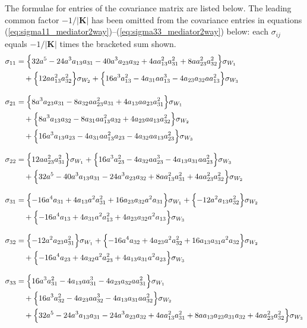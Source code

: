 \documentclass{article}
\begin{document}
The formulae for entries of the covariance matrix are listed below.
The leading common factor $-1/|\mathbf{K}|$ has been omitted from the
covariance entries in equations
(\ref{eq:sigma11_mediator2way})--(\ref{eq:sigma33_mediator2way}) below: each
$\sigma_{ij}$ equals $-1/|\mathbf{K}|$ times the bracketed sum shown.
\begin{align}
\sigma_{11}&= \Bigl\{ 32a^5-24a^3a_{13}a_{31}-40a^3a_{23}a_{32}+4aa_{13}^2a_{31}^2+8aa_{23}^2a_{32}^2 \Bigr\} \sigma_{W_{1}} \nonumber \\
&\quad + \Bigl\{ 12aa_{13}^2a_{32}^2 \Bigr\} \sigma_{W_{2}} + \Bigl\{ 16a^3a_{13}^2-4a_{31}aa_{13}^3-4a_{23}a_{32}aa_{13}^2 \Bigr\} \sigma_{W_{3}} \label{eq:sigma11_mediator2way} \\[8pt]
\sigma_{21}&= \Bigl\{ 8a^3a_{23}a_{31}-8a_{32}aa_{23}^2a_{31}+4a_{13}aa_{23}a_{31}^2 \Bigr\} \sigma_{W_{1}} \nonumber \\
&\quad + \Bigl\{ 8a^3a_{13}a_{32}-8a_{31}aa_{13}^2a_{32}+4a_{23}aa_{13}a_{32}^2 \Bigr\} \sigma_{W_{2}} \nonumber \\
&\quad + \Bigl\{ 16a^3a_{13}a_{23}-4a_{31}aa_{13}^2a_{23}-4a_{32}aa_{13}a_{23}^2 \Bigr\} \sigma_{W_{3}} \label{eq:sigma21_mediator2way} \\[8pt]
\sigma_{22}&= \Bigl\{ 12aa_{23}^2a_{31}^2 \Bigr\} \sigma_{W_{1}} + \Bigl\{ 16a^3a_{23}^2-4a_{32}aa_{23}^3-4a_{13}a_{31}aa_{23}^2 \Bigr\} \sigma_{W_{3}} \nonumber \\
&\quad + \Bigl\{ 32a^5-40a^3a_{13}a_{31}-24a^3a_{23}a_{32}+8aa_{13}^2a_{31}^2+4aa_{23}^2a_{32}^2 \Bigr\} \sigma_{W_{2}} \label{eq:sigma22_mediator2way} \\[8pt]
\sigma_{31}&= \Bigl\{ -16a^4a_{31}+4a_{13}a^2a_{31}^2+16a_{23}a_{32}a^2a_{31} \Bigr\} \sigma_{W_{1}} + \Bigl\{ -12a^2a_{13}a_{32}^2 \Bigr\} \sigma_{W_{2}} \nonumber \\
&\quad + \Bigl\{ -16a^4a_{13}+4a_{31}a^2a_{13}^2+4a_{23}a_{32}a^2a_{13} \Bigr\} \sigma_{W_{3}} \label{eq:sigma31_mediator2way} \\[8pt]
\sigma_{32}&= \Bigl\{ -12a^2a_{23}a_{31}^2 \Bigr\} \sigma_{W_{1}} + \Bigl\{ -16a^4a_{32}+4a_{23}a^2a_{32}^2+16a_{13}a_{31}a^2a_{32} \Bigr\} \sigma_{W_{2}} \nonumber \\
&\quad + \Bigl\{ -16a^4a_{23}+4a_{32}a^2a_{23}^2+4a_{13}a_{31}a^2a_{23} \Bigr\} \sigma_{W_{3}} \label{eq:sigma32_mediator2way} \\[8pt]
\sigma_{33}&= \Bigl\{ 16a^3a_{31}^2-4a_{13}aa_{31}^3-4a_{23}a_{32}aa_{31}^2 \Bigr\} \sigma_{W_{1}} \nonumber \\
&\quad + \Bigl\{ 16a^3a_{32}^2-4a_{23}aa_{32}^3-4a_{13}a_{31}aa_{32}^2 \Bigr\} \sigma_{W_{2}} \nonumber \\
&\quad + \Bigl\{ 32a^5-24a^3a_{13}a_{31}-24a^3a_{23}a_{32}+4aa_{13}^2a_{31}^2+8aa_{13}a_{23}a_{31}a_{32}+4aa_{23}^2a_{32}^2 \Bigr\} \sigma_{W_{3}} \label{eq:sigma33_mediator2way}
\end{align}
\end{document}
